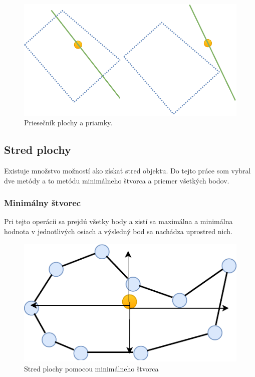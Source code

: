 \begin{figure}[H]
	\centering
	\includegraphics[height=0.3\textwidth]{obrazky-figures/Diagram/Draw/1Points/DP Navrh operacii-0D - PointIntersectionPlaneLine.pdf}
	\caption{Priesečník plochy a priamky.}
	\label{fig:GraphIntersection_Plane_Line}
\end{figure}

\subsection*{Stred plochy}
Existuje množstvo možností ako získať stred objektu. Do tejto práce som vybral dve metódy a to metódu minimálneho štvorca a priemer všetkých bodov. %


\subsubsection{Minimálny štvorec}
Pri tejto operácii sa prejdú všetky body a zistí sa maximálna a minimálna hodnota v jednotlivých osiach a výsledný bod sa nachádza uprostred nich.


\begin{figure}[H]
	\centering
	\includegraphics[height=0.3\textwidth]{obrazky-figures/Diagram/Draw/1Points/DP Navrh operacii-0D - PointMiddle of surface.pdf}
	\caption{Stred plochy pomocou minimálneho štvorca }
	\label{fig:PointMiddleofsurface}
\end{figure}



